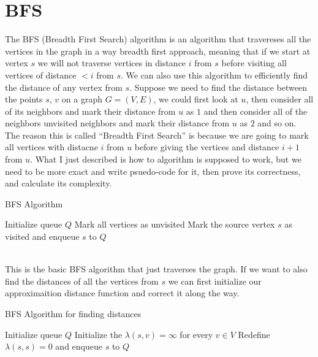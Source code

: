 \documentclass[11pt,a4paper]{article}
\theoremstyle{plain}
\begin{document}
	\section{BFS}
	The BFS (Breadth First Search) algorithm is an algorithm that travereses
	all the vertices in the graph in a way breadth first approach, meaning
	that if we start at vertex $s$ we will not traverse vertices in distance
	$i$ from $s$ before visiting all vertices of distance $<i$ from $s$.
	We can also use this algorithm to efficiently find the distance of
	any vertex from $s$. 
	Suppose we need to find the distance between the points $s$, $v$ on a 
	graph $G=(V,E)$,  we could first look at $u$, then consider all of its 
	neighbors and mark their distance from $u$ as $1$ and then consider all 
	of the neighbors unvisited neighbors and mark their distance from $u$ as 
	$2$ and so on. The reason this is called ``Breadth First Search'' is 
	because we are going to mark
	all vertices with distacne $i$ from $u$ before giving the vertices
	and distance $i+1$ from $u$. What I just described is how to algorithm
	is supposed to work, but we need to be more exact and write psuedo-code
	for it, then prove its correctness, and calculate its complexity.
	\begin{algorithm}
	\caption{BFS Algorithm}
	Initialize queue $Q$\;
	Mark all vertices as unvisited\;
	Mark the source vertex $s$ as visited and enqueue $s$ to $Q$\;
	\end{algorithm} \\
	This is the basic BFS algorithm that just traverses the graph. If we
	want to also find the distances of all the vertices from $s$ we can
	first initialize our approximaition distance function and correct
	it along the way.
	\begin{algorithm}
	\caption{BFS Algorithm for finding distances}
	Initialize queue $Q$\;
	Initialize the $\lambda(s,v)=\infty$ for every $v\in V$\;
	Redefine $\lambda(s,s)=0$ and enqueue $s$ to $Q$\;
	\end{algorithm} \\
	
\end{document}
